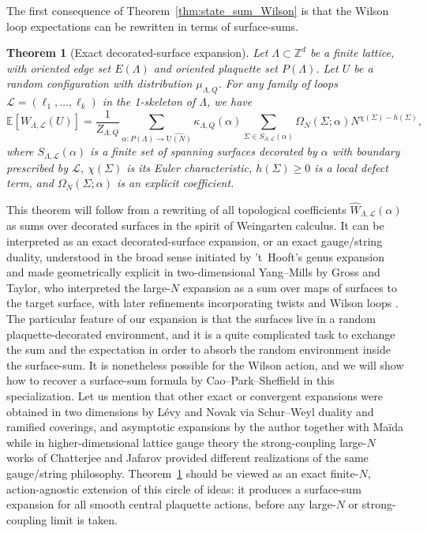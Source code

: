 \documentclass[11pt,a4paper,reqno]{article}
\newtheorem{theorem}{Theorem}[section]
\theoremstyle{definition}
\theoremstyle{remark}
\newcommand\U{{\mathrm U}}
\newcommand\Z{{\mathbb Z}}
\newcommand\E{\mathbb{E}}
\newcommand\Lc{{\mathcal{L}}}
\begin{document}
The first consequence of Theorem~\ref{thm:state_sum_Wilson} is that the Wilson loop expectations can be rewritten in terms of surface-sums.

\begin{theorem}[Exact decorated-surface expansion]\label{thm:surface-sum-Wilsonloops}
Let $\Lambda\subset\Z^d$ be a finite lattice, with oriented edge set $E(\Lambda)$ and oriented plaquette set $P(\Lambda)$. Let $U$ be a random configuration with distribution $\mu_{\Lambda,Q}$. For any family of loops $\Lc=(\ell_1,\ldots,\ell_k)$ in the 1-skeleton of $\Lambda$, we have
\begin{equation}\label{eq:surface_sum}
\E[W_{\Lambda,\Lc}(U)]
=\frac1{Z_{\Lambda,Q}}\sum_{\alpha:P(\Lambda)\to\widehat{\U(N)}}\kappa_{\Lambda,Q}(\alpha)
\sum_{\Sigma\in S_{\Lambda,\Lc}(\alpha)}\Omega_N(\Sigma;\alpha)N^{\chi(\Sigma)-h(\Sigma)},
\end{equation}
where $S_{\Lambda,\Lc}(\alpha)$ is a finite set of spanning surfaces decorated by $\alpha$ with boundary prescribed by $\Lc$, $\chi(\Sigma)$ is its Euler characteristic, $h(\Sigma)\geq0$ is a local defect term, and $\Omega_N(\Sigma;\alpha)$ is an explicit coefficient.
\end{theorem}

This theorem will follow from a rewriting of all topological coefficients $\widehat{W}_{\Lambda,\Lc}(\alpha)$ as sums over decorated surfaces in the spirit of Weingarten calculus. It can be interpreted as an exact decorated-surface expansion, or an exact gauge/string duality, understood in the broad sense initiated by 't~Hooft's genus expansion \cite{Hoo74} and made geometrically explicit in two-dimensional Yang--Mills by Gross and Taylor, who interpreted the large-$N$ expansion as a sum over maps of surfaces to the target surface, with later refinements incorporating twists and Wilson loops \cite{GT,GT2,CMR}. The particular feature of our expansion is that the surfaces live in a random plaquette-decorated environment, and it is a quite complicated task to exchange the sum and the expectation in order to absorb the random environment inside the surface-sum. It is nonetheless possible for the Wilson action, and we will show how to recover a surface-sum formula by Cao--Park--Sheffield \cite{CPS25} in this specialization. Let us mention that other exact or convergent expansions were obtained in two dimensions by L\'evy \cite{Lev08} and Novak \cite{Nov2024} via Schur--Weyl duality and ramified coverings, and asymptotic expansions by the author together with Ma\"ida \cite{LemMai25,LM2} while in higher-dimensional lattice gauge theory the strong-coupling large-$N$ works of Chatterjee \cite{Cha19} and Jafarov \cite{Jaf16} provided different realizations of the same gauge/string philosophy. Theorem~\ref{thm:surface-sum-Wilsonloops} should be viewed as an exact finite-$N$, action-agnostic extension of this circle of ideas: it produces a surface-sum expansion for all smooth central plaquette actions, before any large-$N$ or strong-coupling limit is taken.
\end{document}
